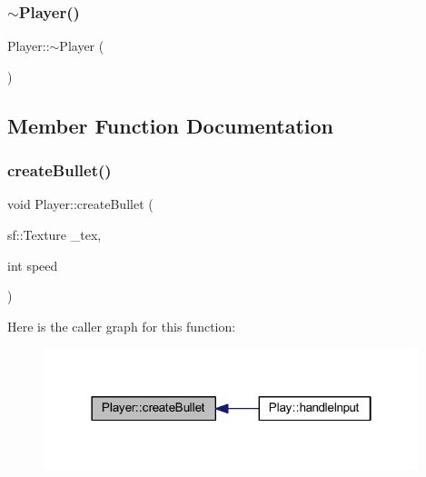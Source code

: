 \mbox{\label{class_player_a749d2c00e1fe0f5c2746f7505a58c062}} 
\subsubsection{\texorpdfstring{$\sim$\+Player()}{~Player()}}
{\footnotesize\ttfamily Player\+::$\sim$\+Player (\begin{DoxyParamCaption}{ }\end{DoxyParamCaption})}



\subsection{Member Function Documentation}
\mbox{\label{class_player_a9d1ab7c1d5ac909e9fc85ca7ed844985}} 
\subsubsection{\texorpdfstring{create\+Bullet()}{createBullet()}}
{\footnotesize\ttfamily void Player\+::create\+Bullet (\begin{DoxyParamCaption}\item[{sf\+::\+Texture}]{\+\_\+tex,  }\item[{int}]{speed }\end{DoxyParamCaption})}

Here is the caller graph for this function\+:
\nopagebreak
\begin{figure}[H]
\begin{center}
\leavevmode
\includegraphics[width=310pt]{class_player_a9d1ab7c1d5ac909e9fc85ca7ed844985_icgraph}
\end{center}
\end{figure}
\mbox{\label{class_player_aa45f751e7ba8afcd9894d57ef4813d50}} 
